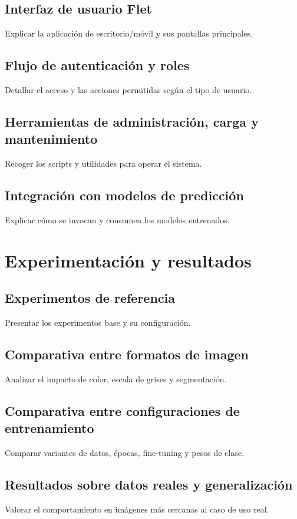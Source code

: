 \documentclass[11pt,spanish,listoffigures,listoftables]{tfgetsinf}
\begin{document}
\section{Interfaz de usuario Flet}
Explicar la aplicación de escritorio/móvil y sus pantallas principales.

\section{Flujo de autenticación y roles}
Detallar el acceso y las acciones permitidas según el tipo de usuario.

\section{Herramientas de administración, carga y mantenimiento}
Recoger los scripts y utilidades para operar el sistema.

\section{Integración con modelos de predicción}
Explicar cómo se invocan y consumen los modelos entrenados.

\chapter{Experimentación y resultados}
\section{Experimentos de referencia}
Presentar los experimentos base y su configuración.

\section{Comparativa entre formatos de imagen}
Analizar el impacto de color, escala de grises y segmentación.

\section{Comparativa entre configuraciones de entrenamiento}
Comparar variantes de datos, épocas, fine-tuning y pesos de clase.

\section{Resultados sobre datos reales y generalización}
Valorar el comportamiento en imágenes más cercanas al caso de uso real.
\end{document}
